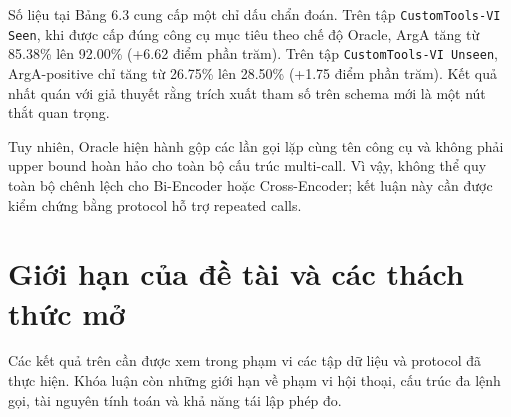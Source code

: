 \begin{table}[htbp]
    \centering
    \caption{Đối chứng chẩn đoán Oracle giữa lỗi truy hồi và trích xuất tham số}
    \label{tab:bảng_6_3}
\end{table}

Số liệu tại Bảng 6.3 cung cấp một chỉ dấu chẩn đoán. Trên tập \texttt{CustomTools-VI Seen}, khi được cấp đúng công cụ mục tiêu theo chế độ Oracle, ArgA tăng từ 85.38\% lên 92.00\% (+6.62 điểm phần trăm). Trên tập \texttt{CustomTools-VI Unseen}, ArgA-positive chỉ tăng từ 26.75\% lên 28.50\% (+1.75 điểm phần trăm). Kết quả nhất quán với giả thuyết rằng trích xuất tham số trên schema mới là một nút thắt quan trọng.

Tuy nhiên, Oracle hiện hành gộp các lần gọi lặp cùng tên công cụ và không phải upper bound hoàn hảo cho toàn bộ cấu trúc multi-call. Vì vậy, không thể quy toàn bộ chênh lệch cho Bi-Encoder hoặc Cross-Encoder; kết luận này cần được kiểm chứng bằng protocol hỗ trợ repeated calls.

\section{Giới hạn của đề tài và các thách thức mở}

Các kết quả trên cần được xem trong phạm vi các tập dữ liệu và protocol đã thực hiện. Khóa luận còn những giới hạn về phạm vi hội thoại, cấu trúc đa lệnh gọi, tài nguyên tính toán và khả năng tái lập phép đo.


